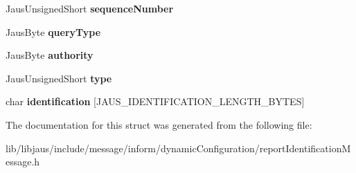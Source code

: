 \begin{DoxyCompactItemize}
\item 
\hypertarget{struct_report_identification_message_struct_ac3aa10b15b0467886e22e1b716bd93a6}{\-Jaus\-Unsigned\-Short {\bfseries sequence\-Number}}\label{struct_report_identification_message_struct_ac3aa10b15b0467886e22e1b716bd93a6}

\item 
\hypertarget{struct_report_identification_message_struct_ad8f4174dc26baef57b3f00746f8b5237}{\-Jaus\-Byte {\bfseries query\-Type}}\label{struct_report_identification_message_struct_ad8f4174dc26baef57b3f00746f8b5237}

\item 
\hypertarget{struct_report_identification_message_struct_a1eb639c376bd26d2692e88f55bdb51d2}{\-Jaus\-Byte {\bfseries authority}}\label{struct_report_identification_message_struct_a1eb639c376bd26d2692e88f55bdb51d2}

\item 
\hypertarget{struct_report_identification_message_struct_ae29fbe6479eeeb4d30d6f461a6f1f126}{\-Jaus\-Unsigned\-Short {\bfseries type}}\label{struct_report_identification_message_struct_ae29fbe6479eeeb4d30d6f461a6f1f126}

\item 
\hypertarget{struct_report_identification_message_struct_ae10e5f4b9cc76ea5f1edbc6377f12e27}{char {\bfseries identification} \mbox{[}\-J\-A\-U\-S\-\_\-\-I\-D\-E\-N\-T\-I\-F\-I\-C\-A\-T\-I\-O\-N\-\_\-\-L\-E\-N\-G\-T\-H\-\_\-\-B\-Y\-T\-E\-S\mbox{]}}\label{struct_report_identification_message_struct_ae10e5f4b9cc76ea5f1edbc6377f12e27}

\end{DoxyCompactItemize}


\-The documentation for this struct was generated from the following file\-:\begin{DoxyCompactItemize}
\item 
lib/libjaus/include/message/inform/dynamic\-Configuration/report\-Identification\-Message.\-h\end{DoxyCompactItemize}
